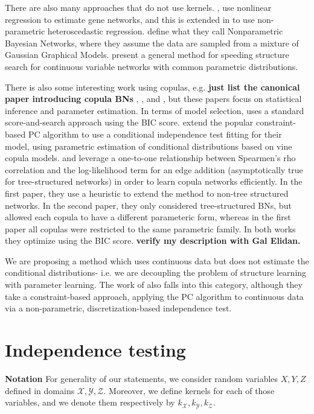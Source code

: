 \documentclass{article} %
\begin{document}
There are also many approaches that do not use kernels.  \cite{imoto2001estimation}, use nonlinear regression to estimate gene networks, and this is extended in \cite{imoto2003bayesian} to use non-parametric heteroscedastic regression.  \cite{ickstadt2010nonparametric} define what they call Nonparametric Bayesian Networks, where they assume the data are sampled from a mixture of Gaussian Graphical Models. \cite{elidan2007ideal} present a general method for speeding structure search for continuous variable networks with common parametric distributions. 

There is also some interesting work using copulas, e.g. {\bf just list the canonical paper introducing copula BNs}  \cite{hanea2006hybrid}, \cite{hanea2008mixed}, and \cite{hanea2010mining}, but these papers focus on statistical inference and parameter estimation.  In terms of model selection, \cite{elidan2010copula} uses a standard score-and-search approach using the BIC score.  \cite{bauer2012pair} extend the popular constraint-based PC algorithm to use a conditional independence test fitting for their model, using parametric estimation of conditional distributions based on vine copula models.  \cite{elidan2012lightning} and \cite{tenzer2013speedy} leverage a one-to-one relationship between Spearmen's rho correlation and the log-likelihood term for an edge addition (asymptotically true for tree-structured networks) in order to learn copula networks efficiently.  In the first paper, they use a heuristic to extend the method to non-tree structured networks.  In the second paper, they only considered tree-structured BNs, but allowed each copula to have a different parameteric form, whereas in the first paper all copulas were restricted to the same parametric family.  In both works they optimize using the BIC score. {\bf verify my description with Gal Elidan.}

We are proposing a method which uses continuous data but does not estimate the conditional distributions- i.e. we are decoupling the problem of structure learning with parameter learning.  The work of \cite{margaritis2005distribution} also falls into this category, although they take a constraint-based approach, applying the PC algorithm to continuous data via a non-parametric, discretization-based independence test.

\section{Independence testing} 
{\bf Notation} 
For generality of our statements, we consider random variables $X, Y, Z$ defined in domains $\mathcal{X}, \mathcal{Y}, \mathcal{Z}$. Moreover,
we define kernels for each of those variables, and we denote them respectively by $k_{\mathcal{X}}, k_{\mathcal{Y}}, k_{\mathcal{Z}}$.
\end{document}
